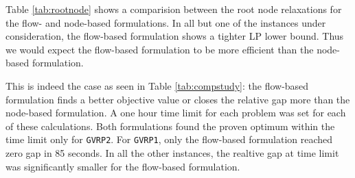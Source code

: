 \documentclass[letterpaper,12pt,onehalfspacing,twoside]{article}
\theoremstyle{msds}
\begin{document}
Table \ref{tab:rootnode} shows a comparision between the root node relaxations for the flow- and node-based formulations. In all but one of the instances under consideration, the flow-based formulation shows a tighter LP lower bound. Thus we would expect the flow-based formulation to be more efficient than the node-based formulation. 

This is indeed the case as seen in Table \ref{tab:compstudy}: the flow-based formulation finds a better objective value or closes the relative gap more than the node-based formulation. A one hour time limit for each problem was set for each of these calculations. Both formulations found the proven optimum within the time limit only for \texttt{GVRP2}. For \texttt{GVRP1}, only the flow-based formulation reached zero gap in 85 seconds. In all the other instances, the realtive gap at time limit was significantly smaller for the flow-based formulation.
\end{document}
